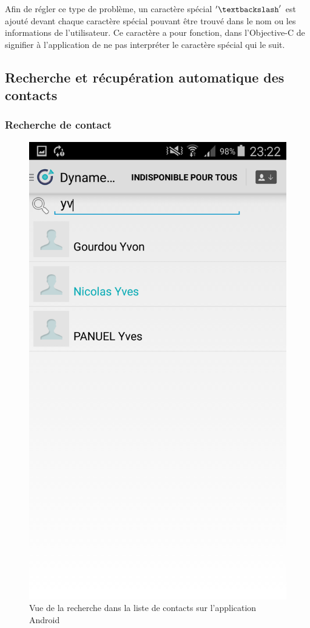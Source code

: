 Afin de régler ce type de problème, un caractère spécial $'\textbackslash'$ est ajouté devant chaque caractère spécial pouvant être trouvé dans le nom ou les informations de l'utilisateur. Ce caractère a pour fonction, dans l'Objective-C de signifier à l'application de ne pas interpréter le caractère spécial qui le suit. 

\subsection{Recherche et récupération automatique des contacts}


\subsubsection{Recherche de contact}

\begin{figure}[!h]
	\centering
	\includegraphics[scale=0.1]{img/recherche.png}
	\caption{\label{recherche} {Vue de la recherche dans la liste de contacts sur l'application Android}}
\end{figure}

